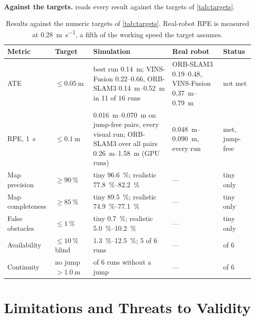 \textbf{Against the targets.}  reads every result
against the targets of \cref{tab:targets}.

\begin{table}[htbp]
\centering
\caption[Results against the numeric targets.]{Results against the numeric
targets of \cref{tab:targets}. Real-robot RPE is measured at
\SI{0.28}{\metre\per\second}, a fifth of the working speed the target assumes.}
\label{tab:targets-status}
\small
\begin{tabularx}{\textwidth}{>{\raggedright\arraybackslash}p{}>{\raggedright\arraybackslash}p{}>{\raggedright\arraybackslash}X>{\raggedright\arraybackslash}p{}>{\raggedright\arraybackslash}p{}}
\toprule
Metric & Target & Simulation & Real robot & Status \\
\midrule
ATE & $\le\SI{0.05}{\metre}$ & best run \SI{0.14}{\metre}; VINS-Fusion
  \SIrange{0.22}{0.66}{}, ORB-SLAM3 \SIrange{0.14}{0.52}{\metre} in 11 of 16
  runs & ORB-SLAM3 \SIrange{0.19}{0.48}{}, VINS-Fusion
  \SIrange{0.37}{0.79}{\metre} & not met \\
RPE, \SI{1}{\second} & $\le\SI{0.1}{\metre}$ & \SIrange{0.016}{0.070}{\metre}
  on jump-free pairs, every visual run; ORB-SLAM3 over all pairs
  \SIrange{0.26}{1.58}{\metre} (GPU runs) & \SIrange{0.048}{0.090}{\metre}, every run &
  met, jump-free \\
Map precision & $\ge\SI{90}{\percent}$ & tiny \SI{96.6}{\percent}; realistic
  \SIrange{77.8}{82.2}{\percent} & --- & tiny only \\
Map completeness & $\ge\SI{85}{\percent}$ & tiny \SI{89.5}{\percent}; realistic
  \SIrange{74.9}{77.1}{\percent} & --- & tiny only \\
False obstacles & $\le\SI{1}{\percent}$ & tiny \SI{0.7}{\percent}; realistic
  \SIrange{5.0}{10.2}{\percent} & --- & tiny only \\
Availability & $\le\SI{10}{\percent}$ blind & \SIrange{1.3}{12.5}{\percent}; 5
  of 6 runs & --- & 5 of 6 \\
Continuity & no jump $>\SI{1.0}{\metre}$ & 4 of 6 runs without a jump & --- &
  4 of 6 \\
\bottomrule
\end{tabularx}
\end{table}

\section{Limitations and Threats to Validity}
\label{sec:limitations}


